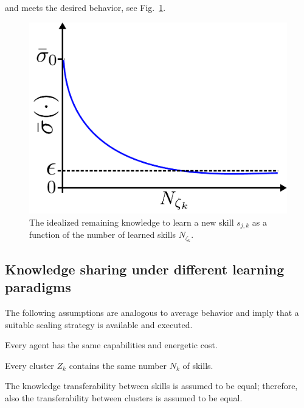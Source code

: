 and meets the desired behavior, see Fig.~\ref{fig:knowledge_idealization}.
\begin{figure}[!t]
	\centering
	\includegraphics[width=0.8\columnwidth]{fig/knowledge_idealization.pdf}
	\caption{The idealized remaining knowledge to learn a new skill $s_{j,k}$ as a function of the number of learned skills $N_{\zeta_k}$.}
	\label{fig:knowledge_idealization}
\end{figure}
\subsection{Knowledge sharing under different learning paradigms}
The following assumptions are analogous to average behavior and imply that a suitable scaling strategy is available and executed.
\begin{tcolorbox}
	\begin{assumption}\label{assumption:agent_similarity}
		Every agent has the same capabilities and energetic cost.
	\end{assumption}
\end{tcolorbox}
\begin{tcolorbox}
	\begin{assumption}\label{assumption:cluster_size}
		Every cluster $Z_k$ contains the same number $N_k $ of skills.
	\end{assumption}
\end{tcolorbox}
\begin{tcolorbox}
	\begin{assumption}\label{assumption:cluster_transferability}
		The knowledge transferability between skills is assumed to be equal; therefore, also the transferability between clusters is assumed to be equal.
	\end{assumption}
\end{tcolorbox}
